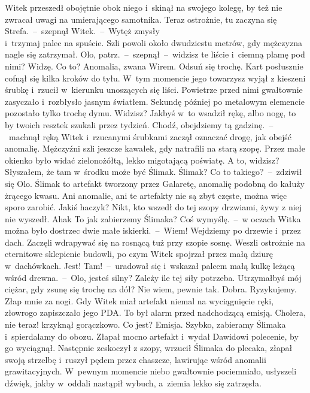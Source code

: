 \documentclass[../MAIN.tex]{subfiles}
\begin{document}
Witek przeszedł obojętnie obok niego i~skinął na swojego kolegę, by też nie zwracał uwagi na umierającego samotnika.
\sd
\xx Teraz ostrożnie, tu zaczyna się Strefa.~--~szepnął Witek.~--~Wytęż zmysły\\ i~trzymaj palec na spuście.
\qm
Szli powoli około dwudziestu metrów, gdy mężczyzna nagle się zatrzymał.
\sx
Olo, patrz.~--~szepnął~--~widzisz te liście i~ciemną plamę pod nimi?
\xx Widzę. Co to?
\xx Anomalia, zwana Wirem. Odsuń się trochę.
\qm
Kart posłusznie cofnął się kilka kroków do tyłu. W~tym momencie jego towarzysz wyjął z kieszeni śrubkę i~rzucił w~kierunku unoszących się liści. Powietrze przed nimi gwałtownie zasyczało i~rozbłysło jasnym światłem. Sekundę później po metalowym elemencie pozostało tylko trochę dymu.
\sd
\xx Widzisz? Jakbyś w~to wsadził rękę, albo nogę, to by twoich resztek szukali przez tydzień. Chodź, obejdziemy tą gadzinę.~--~machnął ręką Witek i~rzucanymi śrubkami zaczął oznaczać drogę, jak obejść anomalię.
\qm
Mężczyźni szli jeszcze kawałek, gdy natrafili na starą szopę. Przez małe okienko było widać zielonożółtą, lekko migotającą poświatę.
\sd
\xx A to, widzisz? Słyszałem, że tam w~środku może być Ślimak.
\xx Ślimak? Co to takiego?~--~zdziwił się Olo.
\xx Ślimak to artefakt tworzony przez Galaretę, anomalię podobną do kałuży żrącego kwasu. Ani anomalie, ani te artefakty nie są zbyt częste, można więc sporo zarobić.
\xx Jakiś haczyk?
\xx Nikt, kto wszedł do tej szopy drzwiami, żywy z niej nie wyszedł.
\xx Aha\3k To jak zabierzemy Ślimaka?
\xx Coś wymyślę.~--~w oczach Witka można było dostrzec dwie małe iskierki.~--~Wiem! Wejdziemy po drzewie i~przez dach.
\qm
Zaczęli wdrapywać się na rosnącą tuż przy szopie sosnę. Weszli ostrożnie na eternitowe sklepienie budowli, po czym Witek spojrzał przez małą dziurę w~dachówkach.
\sd
\xx Jest! Tam!~--~uradował się i~wskazał palcem małą kulkę leżącą wśród drewna.~--~Olo, jesteś silny?
\xx Zależy ile tej siły potrzeba.
\xx Utrzymałbyś mój ciężar, gdy zsunę się trochę na dół?
\xx Nie wiem, pewnie tak.
\xx Dobra. Ryzykujemy. Złap mnie za nogi.
\qm
Gdy Witek miał artefakt niemal na wyciągnięcie ręki, złowrogo zapiszczało jego PDA. To był alarm przed nadchodzącą emisją.
\sd
\xx Cholera, nie teraz! \x krzyknął gorączkowo.
\xx Co jest?
\xx Emisja. Szybko, zabieramy Ślimaka i~spierdalamy do obozu.
\qm
Złapał mocno artefakt i~wydał Dawidowi polecenie, by go wyciągnął. Następnie zeskoczył z szopy, wrzucił Ślimaka do plecaka, złapał swoją strzelbę i~ruszył pędem przez chaszcze, lawirując wśród anomalii grawitacyjnych. W~pewnym momencie niebo gwałtownie pociemniało, usłyszeli dźwięk, jakby w~oddali nastąpił wybuch, a~ziemia lekko się zatrzęsła.
\end{document}
